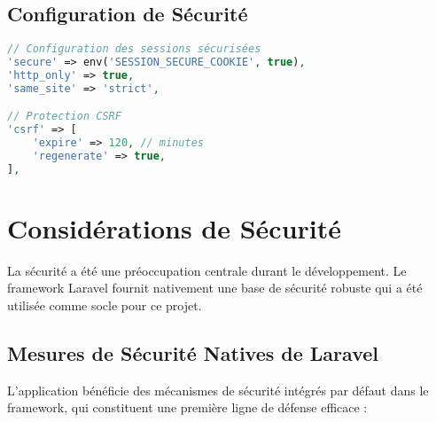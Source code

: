 \documentclass[12pt,a4paper]{report}
\begin{document}
\section{Configuration de Sécurité}
\begin{lstlisting}[language=PHP]
// Configuration des sessions sécurisées
'secure' => env('SESSION_SECURE_COOKIE', true),
'http_only' => true,
'same_site' => 'strict',

// Protection CSRF
'csrf' => [
    'expire' => 120, // minutes
    'regenerate' => true,
],
\end{lstlisting}


\chapter{Considérations de Sécurité}

La sécurité a été une préoccupation centrale durant le développement. Le framework Laravel fournit nativement une base de sécurité robuste qui a été utilisée comme socle pour ce projet.

\section{Mesures de Sécurité Natives de Laravel}

L'application bénéficie des mécanismes de sécurité intégrés par défaut dans le framework, qui constituent une première ligne de défense efficace :
\end{document}
